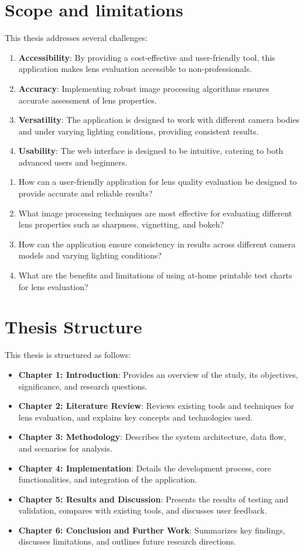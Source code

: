 \section*{Scope and limitations}

This thesis addresses several challenges:
\begin{enumerate}
    \item \textbf{Accessibility}: By providing a cost-effective and user-friendly tool, this application makes lens evaluation accessible to non-professionals.
    \item \textbf{Accuracy}: Implementing robust image processing algorithms ensures accurate assessment of lens properties.
    \item \textbf{Versatility}: The application is designed to work with different camera bodies and under varying lighting conditions, providing consistent results.
    \item \textbf{Usability}: The web interface is designed to be intuitive, catering to both advanced users and beginners.
\end{enumerate}
\begin{enumerate}
    \item How can a user-friendly application for lens quality evaluation be designed to provide accurate and reliable results?
    \item What image processing techniques are most effective for evaluating different lens properties such as sharpness, vignetting, and bokeh?
    \item How can the application ensure consistency in results across different camera models and varying lighting conditions?
    \item What are the benefits and limitations of using at-home printable test charts for lens evaluation?
\end{enumerate}

\section*{Thesis Structure}
This thesis is structured as follows:
\begin{itemize}
    \item \textbf{Chapter 1: Introduction}: Provides an overview of the study, its objectives, significance, and research questions.
    \item \textbf{Chapter 2: Literature Review}: Reviews existing tools and techniques for lens evaluation, and explains key concepts and technologies used.
    \item \textbf{Chapter 3: Methodology}: Describes the system architecture, data flow, and scenarios for analysis.
    \item \textbf{Chapter 4: Implementation}: Details the development process, core functionalities, and integration of the application.
    \item \textbf{Chapter 5: Results and Discussion}: Presents the results of testing and validation, compares with existing tools, and discusses user feedback.
    \item \textbf{Chapter 6: Conclusion and Further Work}: Summarizes key findings, discusses limitations, and outlines future research directions.
\end{itemize}